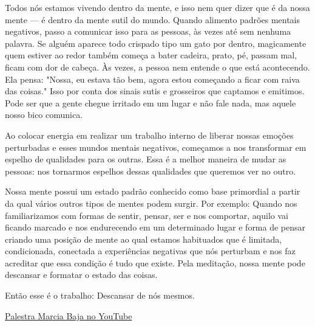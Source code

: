 Todos nós estamos vivendo dentro da mente, e isso nem quer dizer que é da nossa mente — é dentro da mente sutil do mundo. Quando alimento padrões mentais negativos, passo a comunicar isso para as pessoas, às vezes até sem nenhuma palavra. Se alguém aparece todo crispado tipo um gato por dentro, magicamente quem estiver ao redor também começa a bater cadeira, prato, pé, passam mal, ficam com dor de cabeça. Às vezes, a pessoa nem entende o que está acontecendo. Ela pensa: "Nossa, eu estava tão bem, agora estou começando a ficar com raiva das coisas." Isso por conta dos sinais sutis e grosseiros que captamos e emitimos. Pode ser que a gente chegue irritado em um lugar e não fale nada, mas aquele nosso bico comunica.

Ao colocar energia em realizar um trabalho interno de liberar nossas emoções perturbadas e esses mundos mentais negativos, começamos a nos transformar em espelho de qualidades para os outras. Essa é a melhor maneira de mudar as pessoas: nos tornarmos espelhos dessas qualidades que queremos ver no outro.

Nossa mente possui um estado padrão conhecido como base primordial a partir da qual vários outros tipos de mentes podem surgir. Por exemplo: Quando nos familiarizamos com formas de sentir, pensar, ser e nos comportar, aquilo vai ficando marcado e nos endurecendo em um determinado lugar e forma de pensar criando uma posição de mente ao qual estamos habituados que é limitada, condicionada, conectada a experiências negativas que nós perturbam e nos faz acreditar que essa condição é tudo que existe. Pela meditação, nossa mente pode descansar e formatar o estado das coisas. 

Então esse é o trabalho: Descansar de nós mesmos.

\href{https://www.youtube.com/watch?v=WCxLdFbKu0w}{Palestra Marcia Baja no YouTube}

